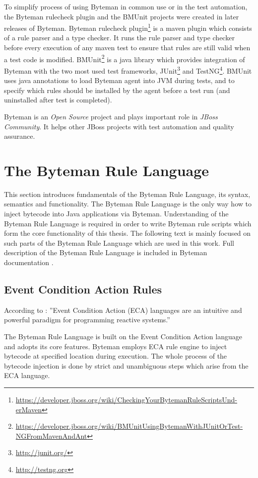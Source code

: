 \documentclass[12pt,oneside]{fithesis2}
\begin{document}
To simplify process of using Byteman in common use or in the test automation, the Byteman rulecheck plugin and the BMUnit projects were created in later releases of Byteman. Byteman rulecheck plugin\footnote{\url{https://developer.jboss.org/wiki/CheckingYourBytemanRuleScriptsUnd-erMaven}} is a maven plugin which consists of a rule parser and a type checker. It runs the rule parser and type checker before every execution of any maven test to ensure that rules are still valid when a test code is modified. BMUnit\footnote{\url{https://developer.jboss.org/wiki/BMUnitUsingBytemanWithJUnitOrTest-NGFromMavenAndAnt}} is a java library which provides integration of Byteman with the two most used test frameworks, JUnit\footnote{\url{http://junit.org/}} and TestNG\footnote{\url{http://testng.org}}. BMUnit uses java annotations to load Byteman agent into JVM during tests, and to specify which rules should be installed by the agent before a test run (and uninstalled after test is completed).

Byteman is an \textit{Open Source} project and plays important role in \textit{JBoss Community}. It helps other JBoss projects with test automation and quality assurance.

\section{The Byteman Rule Language}
\label{byteman_rule_language}
This section introduces fundamentals of the Byteman Rule Language, its syntax, semantics and functionality. The Byteman Rule Language is the only way how to inject bytecode into Java applications via Byteman. Understanding of the Byteman Rule Language is required in order to write Byteman rule scripts which form the core functionality of this thesis. The following text is mainly focused on such parts of the Byteman Rule Language which are used in this work. Full description of the Byteman Rule Language is included in Byteman documentation \cite[The Byteman Rule Language]{byteman_doc}.

\subsection{Event Condition Action Rules}
\label{subsec:eca_sec}
According to \cite{eca}: ''Event Condition Action (ECA) languages are an intuitive and powerful paradigm for programming reactive systems.'' 

The Byteman Rule Language is built on the Event Condition Action language and adopts its core features. Byteman employs ECA rule engine to inject bytecode at specified location during execution. The whole process of the bytecode injection is done by strict and unambiguous steps which arise from the ECA language.
\end{document}
